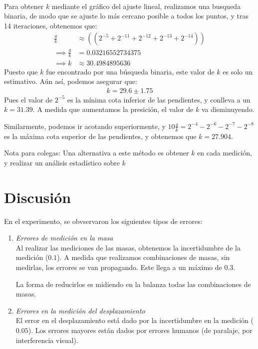 \documentclass{article}
\begin{document}
\begin{multicols}{2}
\begin{align*}
\end{align*}
Para obtener $k$ mediante el gráfico del ajuste lineal, realizamos una busqueda binaria, de modo que se ajuste lo más cercano posible a todos los puntos, y tras 14 iteraciones, obtenemos que:
\begin{align*}
    \frac{g}{k}&\approx ((2^{-5}+2^{-11}+2^{-12}+2^{-13}+2^{-14}))\\
    \implies \frac{g}{k}&= 0.03216552734375\\
    \implies k &\approx 30.4984895636
\end{align*}
Puesto que $k$ fue encontrado por una búsqueda binaria, este valor de $k$ es solo un estimativo. Aún así, podemos asegurar que:
\begin{align*}
    k= 29.6\pm 1.75
\end{align*}
Pues el valor de $2^{-5}$ es la mínima cota inferior de las pendientes, y conlleva a un $k=31.39$. A medida que aumentamos la presición, el valor de $k$ va disminuyendo.

Similarmente, podemos ir acotando superiormente, y $10\frac{g}{k}=2^{-4}-2^{-6}-2^{-7}-2^{-8}$ es la máxima cota superior de las pendientes, y obtenemos que $k=27.904$.

Nota para colegas: Una alternativa a este método es obtener $k$ en cada medición, y realizar un análisis estadístico sobre $k$
\columnbreak

\centering
    \section{Discusión}
\raggedright

En el experimento, se obvservaron los siguientes tipos de errores:

\begin{enumerate}[start=1, label={\bfseries \arabic*})]
\item \emph{Errores de medición en la masa}\\
Al realizar las mediciones de las masas, obtenemos la incertidumbre de la medición ($0.1$). A medida que realizamos combinaciones de masas, sin medirlas, los errores se van propagando. Este llega a un máximo de $0.3$.

La forma de reducirlos es midiendo en la balanza todas las combinaciones de masas.
\item \emph{Errores en la medición del desplazamiento}\\
El error en el desplazamiento está dado por la incertidumbre en la medición ($0.05$). Los errores mayores están dados por errores humanos (de paralaje, por interferencia visual).


\end{enumerate}
\end{multicols}
\end{document}
